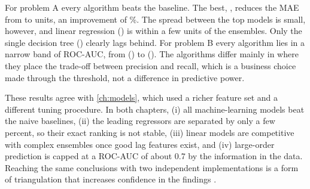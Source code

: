 


For problem A every algorithm beats the baseline. The best, \AlgRegBest, reduces the MAE from \AlgRegBaseMAE to
\AlgRegBestMAE units, an improvement of \AlgRegGain\%. The spread between the top models is small, however, and
linear regression (\AlgLinMAE) is within a few units of the ensembles. Only the single decision tree
(\AlgDTMAE) clearly lags behind. For problem B every algorithm lies in a narrow band of ROC-AUC, from
\AlgClsWorstAUC (\AlgClsWorst) to \AlgClsBestAUC (\AlgClsBest). The algorithms differ mainly in where they place
the trade-off between precision and recall, which is a business choice made through the threshold, not a
difference in predictive power.

These results agree with \cref{ch:models}, which used a richer feature set and a different tuning procedure. In
both chapters, (i) all machine-learning models beat the naive baselines, (ii) the leading regressors are
separated by only a few percent, so their exact ranking is not stable, (iii) linear models are competitive with
complex ensembles once good lag features exist, and (iv) large-order prediction is capped at a ROC-AUC of about
0.7 by the information in the data. Reaching the same conclusions with two independent implementations is a
form of triangulation that increases confidence in the findings \citep{makridakis2018, kuhn2019}.

